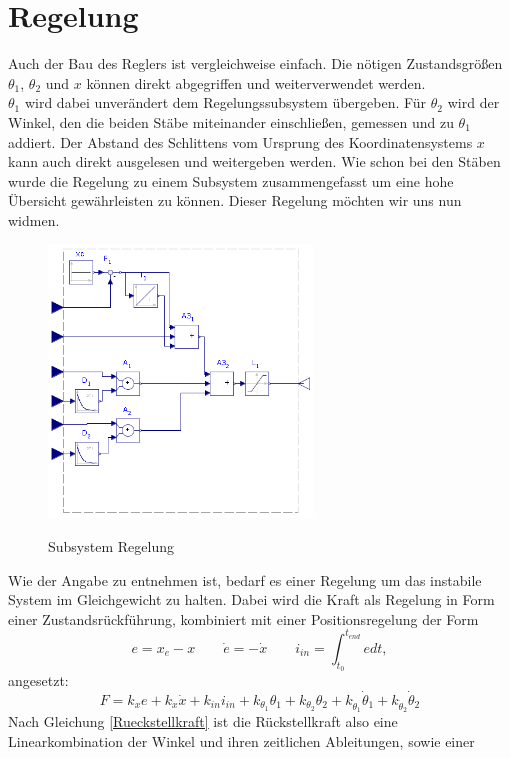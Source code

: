 \documentclass[a4paper, 10pt]{report}
\begin{document}
\section{Regelung}
Auch der Bau des Reglers ist vergleichweise einfach. Die nötigen Zustandsgrößen $\theta_{1}$, $\theta_{2}$ und $x$ können direkt abgegriffen und weiterverwendet werden. \\
$\theta_{1}$ wird dabei unverändert dem Regelungssubsystem übergeben. Für $\theta_{2}$ wird der Winkel, den die beiden Stäbe miteinander einschließen, gemessen und zu $\theta_{1}$ addiert. Der Abstand des Schlittens vom Ursprung des Koordinatensystems $x$ kann auch direkt ausgelesen und weitergeben werden. 
Wie schon bei den Stäben wurde die Regelung zu einem Subsystem zusammengefasst um eine hohe Übersicht gewährleisten zu können. Dieser Regelung möchten wir uns nun widmen. \newpage
\begin{figure}
\centering  %
\label{SubsystemRegelung}
{\includegraphics[width=7cm]{MapleSimRegelungCut}}
\caption{Subsystem Regelung}
\end{figure}
\noindent
Wie der Angabe zu entnehmen ist, bedarf es einer Regelung um das instabile System im Gleichgewicht zu halten. Dabei wird die Kraft als Regelung in Form einer Zustandsrückführung, kombiniert mit einer Positionsregelung der Form
\begin{equation}
\label{Auslenkungen}
e = x_{e} - x \qquad \dot{e} = - \dot{x} \qquad i_{in} = \int_{t_{0}}^{t_{end}} e  dt,
\end{equation}
angesetzt:
\begin{equation}
\label{Rueckstellkraft}
F = k_{x}e + k_{\dot{x}}\dot{x} + k_{in}i_{in} + k_{\theta_{1}}\theta_{1} + k_{\theta_{2}}\theta_{2} + k_{\dot{\theta}_{1}}\dot{\theta}_{1} + k_{\dot{\theta}_{2}}\dot{\theta}_{2}
\end{equation}
Nach Gleichung \ref{Rueckstellkraft} ist die Rückstellkraft also eine Linearkombination der Winkel und ihren zeitlichen Ableitungen, sowie einer
\end{document}
